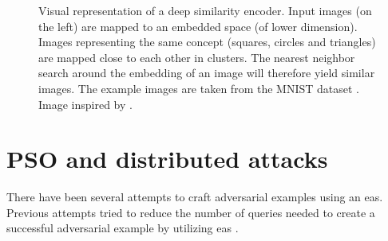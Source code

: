 \begin{figure}
\caption[Deep similarity encoder]{Visual representation of a deep similarity encoder. Input images (on the left) are mapped to an embedded space (of lower dimension). Images representing the same concept (squares, circles and triangles) are mapped close to each other in clusters. The nearest neighbor search around the embedding of an image will therefore yield similar images. The example images are taken from the MNIST dataset \cite{mnist}. Image inspired by \cite{deep_similarity_encoder}.}
\label{fig:deep_similarity_encoder}
\end{figure}

\section{PSO and distributed attacks}\label{sec:pso_and_distributed_attacks}
There have been several attempts to craft adversarial examples using an \glspl{ea}. Previous attempts tried to reduce the number of queries needed to create a successful adversarial example by utilizing \glspl{ea} \cite{genattack,dong2019efficient,mosli2019they,audio_pso,distributed_pso_attack,suryanto2020}. \\

